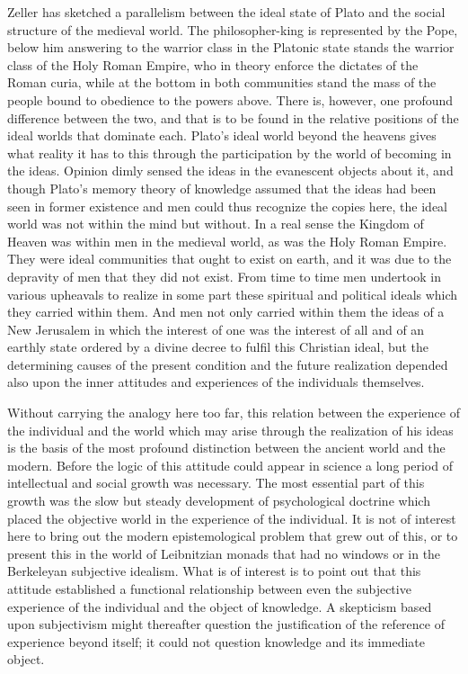 \documentclass[12pt]{article}
\begin{document}
Zeller has sketched a parallelism between the ideal
state of Plato and the social structure of the medieval
world. The philosopher-king is represented by the Pope,
below him answering to the warrior class in the Platonic
state stands the warrior class of the Holy Roman
Empire, who in theory enforce the dictates of the
Roman curia, while at the bottom in both communities
stand the mass of the people bound to obedience to the
powers above. There is, however, one profound difference
between the two, and that is to be found in the
relative positions of the ideal worlds that dominate
each. Plato's ideal world beyond the heavens gives
what reality it has to this through the participation
by the world of becoming in the ideas. Opinion dimly
sensed the ideas in the evanescent objects about it, and
though Plato's memory theory of knowledge assumed
that the ideas had been seen in former existence and
men could thus recognize the copies here, the ideal
world was not within the mind but without. In a real
sense the Kingdom of Heaven was within men in the
medieval world, as was the Holy Roman Empire. They
were ideal communities that ought to exist on earth,
and it was due to the depravity of men that they did
not exist. From time to time men undertook in various
upheavals to realize in some part these spiritual and
political ideals which they carried within them. And
men not only carried within them the ideas of a New
Jerusalem in which the interest of one was the interest
of all and of an earthly state ordered by a divine
decree to fulfil this Christian ideal, but the determining
causes of the present condition and the future
realization depended also upon the inner attitudes and
experiences of the individuals themselves.


Without carrying the analogy here too far, this
relation between the experience of the individual and
the world which may arise through the realization of
his ideas is the basis of the most profound distinction
between the ancient world and the modern. Before
the logic of this attitude could appear in science a long
period of intellectual and social growth was necessary.
The most essential part of this growth was the slow
but steady development of psychological doctrine which
placed the objective world in the experience of the
individual. It is not of interest here to bring out the
modern epistemological problem that grew out of this,
or to present this in the world of Leibnitzian monads
that had no windows or in the Berkeleyan subjective
idealism. What is of interest is to point out that this
attitude established a functional relationship between
even the subjective experience of the individual and the
object of knowledge. A skepticism based upon subjectivism
might thereafter question the justification of
the reference of experience beyond itself; it could not
question knowledge and its immediate object.
\end{document}
